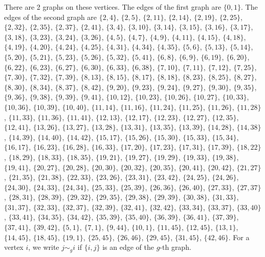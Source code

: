 \documentclass[11pt]{article}
\begin{document}
There are 2 graphs on these vertices. The edges of the first graph are $\{0,1\}$. The edges of the second graph are $\{2,4\}$, $\{2,5\}$, $\{2,11\}$, $\{2,14\}$, $\{2,19\}$, $\{2,25\}$, $\{2,32\}$, $\{2,35\}$, $\{2,37\}$, $\{2,41\}$, $\{3,4\}$, $\{3,10\}$, $\{3,14\}$, $\{3,15\}$, $\{3,16\}$, $\{3,17\}$, $\{3,18\}$, $\{3,23\}$, $\{3,24\}$, $\{3,26\}$, $\{4,5\}$, $\{4,7\}$, $\{4,9\}$, $\{4,11\}$, $\{4,15\}$, $\{4,18\}$, $\{4,19\}$, $\{4,20\}$, $\{4,24\}$, $\{4,25\}$, $\{4,31\}$, $\{4,34\}$, $\{4,35\}$, $\{5,6\}$, $\{5,13\}$, $\{5,14\}$, $\{5,20\}$, $\{5,21\}$, $\{5,23\}$, $\{5,26\}$, $\{5,32\}$, $\{5,41\}$, $\{6,8\}$, $\{6,9\}$, $\{6,19\}$, $\{6,20\}$, $\{6,22\}$, $\{6,23\}$, $\{6,27\}$, $\{6,30\}$, $\{6,33\}$, $\{6,38\}$, $\{7,10\}$, $\{7,11\}$, $\{7,12\}$, $\{7,25\}$, $\{7,30\}$, $\{7,32\}$, $\{7,39\}$, $\{8,13\}$, $\{8,15\}$, $\{8,17\}$, $\{8,18\}$, $\{8,23\}$, $\{8,25\}$, $\{8,27\}$, $\{8,30\}$, $\{8,34\}$, $\{8,37\}$, $\{8,42\}$, $\{9,20\}$, $\{9,23\}$, $\{9,24\}$, $\{9,27\}$, $\{9,30\}$, $\{9,35\}$, $\{9,36\}$, $\{9,38\}$, $\{9,39\}$, $\{9,41\}$, $\{10,12\}$, $\{10,23\}$, $\{10,26\}$, $\{10,27\}$, $\{10,33\}$, $\{10,36\}$, $\{10,39\}$, $\{10,40\}$, $\{11,14\}$, $\{11,16\}$, $\{11,24\}$, $\{11,25\}$, $\{11,26\}$, $\{11,28\}$, $\{11,33\}$, $\{11,36\}$, $\{11,41\}$, $\{12,13\}$, $\{12,17\}$, $\{12,23\}$, $\{12,27\}$, $\{12,35\}$, $\{12,41\}$, $\{13,26\}$, $\{13,27\}$, $\{13,28\}$, $\{13,31\}$, $\{13,35\}$, $\{13,39\}$, $\{14,28\}$, $\{14,38\}$, $\{14,39\}$, $\{14,40\}$, $\{14,42\}$, $\{15,17\}$, $\{15,26\}$, $\{15,30\}$, $\{15,33\}$, $\{15,34\}$, $\{16,17\}$, $\{16,23\}$, $\{16,28\}$, $\{16,33\}$, $\{17,20\}$, $\{17,23\}$, $\{17,31\}$, $\{17,39\}$, $\{18,22\}$, $\{18,29\}$, $\{18,33\}$, $\{18,35\}$, $\{19,21\}$, $\{19,27\}$, $\{19,29\}$, $\{19,33\}$, $\{19,38\}$, $\{19,41\}$, $\{20,27\}$, $\{20,28\}$, $\{20,30\}$, $\{20,32\}$, $\{20,35\}$, $\{20,41\}$, $\{20,42\}$, $\{21,27\}$, $\{21,35\}$, $\{21,38\}$, $\{22,33\}$, $\{23,26\}$, $\{23,31\}$, $\{23,42\}$, $\{24,25\}$, $\{24,26\}$, $\{24,30\}$, $\{24,33\}$, $\{24,34\}$, $\{25,33\}$, $\{25,39\}$, $\{26,36\}$, $\{26,40\}$, $\{27,33\}$, $\{27,37\}$, $\{28,31\}$, $\{28,39\}$, $\{29,32\}$, $\{29,35\}$, $\{29,38\}$, $\{29,39\}$, $\{30,38\}$, $\{31,33\}$, $\{31,37\}$, $\{32,33\}$, $\{32,37\}$, $\{32,39\}$, $\{32,41\}$, $\{32,42\}$, $\{33,34\}$, $\{33,37\}$, $\{33,40\}$, $\{33,41\}$, $\{34,35\}$, $\{34,42\}$, $\{35,39\}$, $\{35,40\}$, $\{36,39\}$, $\{36,41\}$, $\{37,39\}$, $\{37,41\}$, $\{39,42\}$, $\{5,1\}$, $\{7,1\}$, $\{9,44\}$, $\{10,1\}$, $\{11,45\}$, $\{12,45\}$, $\{13,1\}$, $\{14,45\}$, $\{18,45\}$, $\{19,1\}$, $\{25,45\}$, $\{26,46\}$, $\{29,45\}$, $\{31,45\}$, $\{42,46\}$. For a vertex $i$, we write $j\sim_g i$ if $\{i,j\}$ is an edge of the $g$-th graph.
\end{document}
